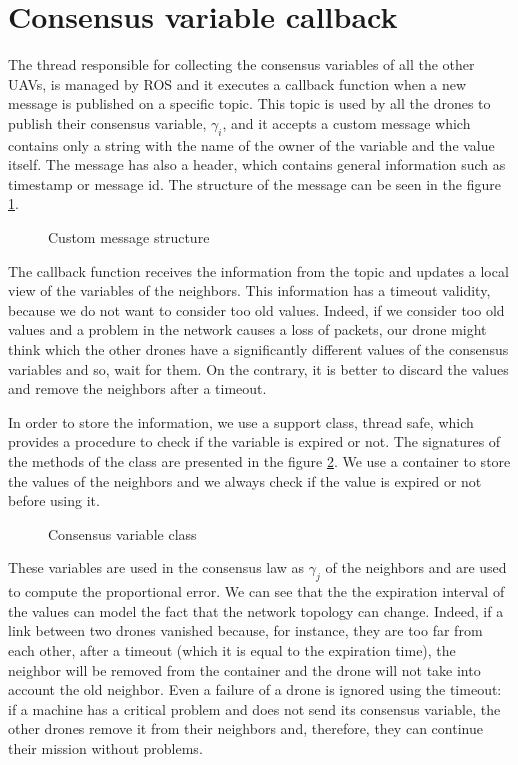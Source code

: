 \section{Consensus variable callback\label{sec:consensus_variable_callback}}

The thread responsible for collecting the consensus variables of all the other UAVs,
is managed by ROS and it executes a callback function when a new message is published
on a specific topic.
This topic is used by all the drones to publish their consensus variable, $\gamma_i$,
and it accepts a custom message which contains only a string with the name of the
owner of the variable and the value itself. The message has also a header, which contains
general information such as timestamp or message id.
The structure of the message can be seen in the figure \ref{fig:custom_message}.

\begin{figure}[h]
\centering
  
\caption{Custom message structure}
\label{fig:custom_message}
\end{figure}

The callback function receives the information from the topic and updates a local
view of the variables of the neighbors. This information has a timeout validity,
because we do not want to consider too old values. Indeed, if we consider too old
values and a problem in the network causes a loss of packets, our drone might
think which the other drones have a significantly different values of the consensus variables
and so, wait for them. On the contrary, it is better to discard the values and
remove the neighbors after a timeout.

In order to store the information, we use a support class, thread safe, which
provides a procedure to check if the variable is expired or not.
The signatures of the methods of the class are presented in the figure
\ref{fig:consensuss_variable_class}.
We use a container to store the values of the neighbors and we always check if the
value is expired or not before using it.

\begin{figure}[ht]
\centering
  
\caption{Consensus variable class}
\label{fig:consensuss_variable_class}
\end{figure}

These variables are used in the consensus law %
as $\gamma_j$ of the neighbors and are used to compute the proportional error.
We can see that the the expiration interval of the values can model the
fact that the network topology can change.
Indeed, if a link between two drones vanished because, for instance, they are
too far from each other, after a timeout (which it is equal to the expiration time),
the neighbor will be removed from the container and the drone will not take into
account the old neighbor.
Even a failure of a drone is ignored using the timeout: if a machine has a critical
problem and does not send its consensus variable, the other drones remove it from
their neighbors and, therefore, they can continue their mission without problems.
